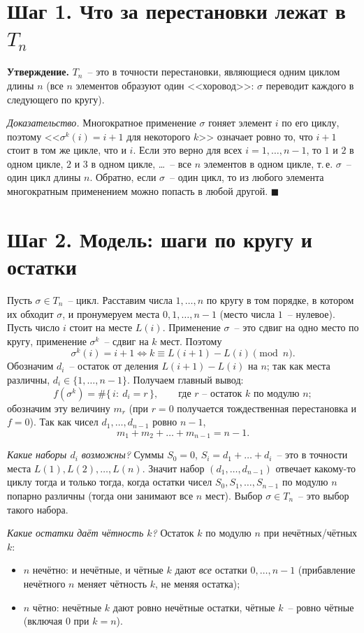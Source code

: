 \documentclass[12pt,a4paper]{article}
\begin{document}
\section{Шаг 1. Что за перестановки лежат в \texorpdfstring{$T_n$}{T\_n}}

\textbf{Утверждение.} $T_n$~-- это в точности перестановки, являющиеся
одним циклом длины $n$ (все $n$ элементов образуют один <<хоровод>>:
$\sigma$ переводит каждого в следующего по кругу).

\emph{Доказательство.} Многократное применение $\sigma$ гоняет элемент $i$
по его циклу, поэтому <<$\sigma^{k}(i)=i+1$ для некоторого $k$>> означает
ровно то, что $i+1$ стоит в том же цикле, что и $i$. Если это верно для
всех $i=1,\dots,n-1$, то $1$ и $2$ в одном цикле, $2$ и $3$ в одном
цикле, \dots~-- все $n$ элементов в одном цикле, т.\,е. $\sigma$~--
один цикл длины $n$. Обратно, если $\sigma$~-- один цикл, то из любого
элемента многократным применением можно попасть в любой другой.
\hfill$\blacksquare$

\section{Шаг 2. Модель: шаги по кругу и остатки}

Пусть $\sigma\in T_n$~-- цикл. Расставим числа $1,\dots,n$ по кругу в том
порядке, в котором их обходит $\sigma$, и пронумеруем места $0,1,\dots,n-1$
(место числа $1$~-- нулевое). Пусть число $i$ стоит на месте $L(i)$.
Применение $\sigma$~-- это сдвиг на одно место по кругу, применение
$\sigma^{k}$~-- сдвиг на $k$ мест. Поэтому
\[
  \sigma^{k}(i)=i+1
  \iff
  k\equiv L(i+1)-L(i)\pmod n .
\]
Обозначим $d_i$~-- остаток от деления $L(i+1)-L(i)$ на $n$; так как места
различны, $d_i\in\{1,\dots,n-1\}$. Получаем главный вывод:
\[
  f(\sigma^{k})=\#\{\,i:\ d_i=r\,\},\qquad\text{где $r$~-- остаток $k$ по модулю $n$};
\]
обозначим эту величину $m_r$ (при $r=0$ получается тождественная
перестановка и $f=0$). Так как чисел $d_1,\dots,d_{n-1}$ ровно $n-1$,
\[
  m_1+m_2+\dots+m_{n-1}=n-1. \tag{$\ast$}
\]

\emph{Какие наборы $d_i$ возможны?} Суммы $S_0=0$, $S_i=d_1+\dots+d_i$~--
это в точности места $L(1),L(2),\dots,L(n)$. Значит набор
$(d_1,\dots,d_{n-1})$ отвечает какому-то циклу тогда и только тогда, когда
остатки чисел $S_0,S_1,\dots,S_{n-1}$ по модулю $n$ попарно различны
(тогда они занимают все $n$ мест). Выбор $\sigma\in T_n$~-- это выбор
такого набора.

\emph{Какие остатки даёт чётность $k$?} Остаток $k$ по модулю $n$ при
нечётных/чётных $k$:
\begin{itemize}
  \item $n$ нечётно: и нечётные, и чётные $k$ дают \emph{все} остатки
        $0,\dots,n-1$ (прибавление нечётного $n$ меняет чётность $k$, не
        меняя остатка);
  \item $n$ чётно: нечётные $k$ дают ровно нечётные остатки, чётные
        $k$~-- ровно чётные (включая $0$ при $k=n$).
\end{itemize}
\end{document}
